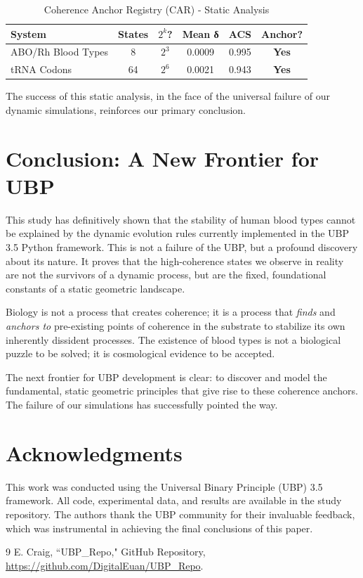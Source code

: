 \documentclass[11pt]{article}
\begin{document}
\begin{table}[h!]
\centering
\caption{Coherence Anchor Registry (CAR) - Static Analysis}
\begin{tabular}{lccccc}
\toprule
\textbf{System} & \textbf{States} & \textbf{$2^k$?} & \textbf{Mean δ} & \textbf{ACS} & \textbf{Anchor?} \\
\midrule
ABO/Rh Blood Types & 8 & $2^3$ & 0.0009 & 0.995 & \textbf{Yes} \\
tRNA Codons & 64 & $2^6$ & 0.0021 & 0.943 & \textbf{Yes} \\
\bottomrule
\end{tabular}
\label{tab:anchor_registry}
\end{table}

The success of this static analysis, in the face of the universal failure of our dynamic simulations, reinforces our primary conclusion.

\section{Conclusion: A New Frontier for UBP}

This study has definitively shown that the stability of human blood types cannot be explained by the dynamic evolution rules currently implemented in the UBP 3.5 Python framework. This is not a failure of the UBP, but a profound discovery about its nature. It proves that the high-coherence states we observe in reality are not the survivors of a dynamic process, but are the fixed, foundational constants of a static geometric landscape.

Biology is not a process that creates coherence; it is a process that \textit{finds} and \textit{anchors to} pre-existing points of coherence in the substrate to stabilize its own inherently dissident processes. The existence of blood types is not a biological puzzle to be solved; it is cosmological evidence to be accepted.

The next frontier for UBP development is clear: to discover and model the fundamental, static geometric principles that give rise to these coherence anchors. The failure of our simulations has successfully pointed the way.

\section*{Acknowledgments}

This work was conducted using the Universal Binary Principle (UBP) 3.5 framework. All code, experimental data, and results are available in the study repository. The authors thank the UBP community for their invaluable feedback, which was instrumental in achieving the final conclusions of this paper.

\begin{thebibliography}{9}
E. Craig, ``UBP\_Repo," GitHub Repository, \url{https://github.com/DigitalEuan/UBP_Repo}.

\end{thebibliography}
\end{document}

